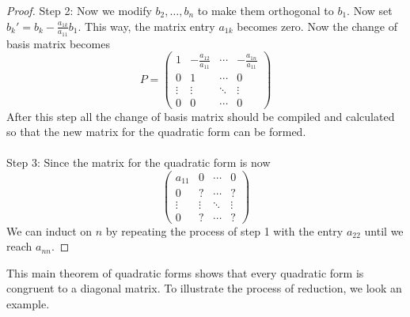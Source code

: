 \documentclass[a4paper]{article}
\begin{document}
\begin{thm}{}{}
\begin{proof}
Step 2: Now we modify $b_2,\dots,b_n$ to make them orthogonal to $b_1$. Now set $b_k'=b_k-\frac{a_{1k}}{a_{11}}b_1$. This way, the matrix entry $a_{1k}$ becomes zero. Now the change of basis matrix becomes $$P=\begin{pmatrix}
1 & -\frac{a_{12}}{a_{11}} & \cdots & -\frac{a_{1n}}{a_{11}}\\
0 & 1 & \cdots & 0\\
\vdots & \vdots & \ddots & \vdots\\
0 & 0 & \cdots & 0
\end{pmatrix}$$
After this step all the change of basis matrix should be compiled and calculated so that the new matrix for the quadratic form can be formed. \\~\\
Step 3: Since the matrix for the quadratic form is now $$\begin{pmatrix}
a_{11} & 0 & \cdots & 0\\
0 & ? & \cdots & ?\\
\vdots & \vdots & \ddots & \vdots\\
0 & ? & \cdots & ?
\end{pmatrix}$$
We can induct on $n$ by repeating the process of step 1 with the entry $a_{22}$ until we reach $a_{nn}$. 
\end{proof}
\end{thm}

This main theorem of quadratic forms shows that every quadratic form is congruent to a diagonal matrix. To illustrate the process of reduction, we look an example. 
\end{document}
